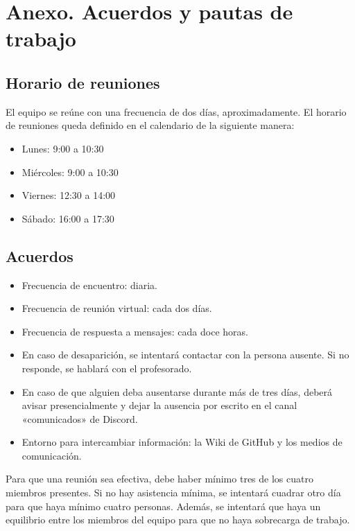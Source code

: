 \documentclass[../main.tex]{subfiles}
\begin{document}
\section{Anexo. Acuerdos y pautas de trabajo}
\subsection{Horario de reuniones}

El equipo se reúne con una frecuencia de dos días, aproximadamente. El horario de reuniones queda definido en el calendario de la siguiente manera: 

\begin{itemize}
    \item Lunes: 9:00 a 10:30
    \item Miércoles: 9:00 a 10:30
    \item Viernes: 12:30 a 14:00
    \item Sábado: 16:00 a 17:30
\end{itemize}

\subsection{Acuerdos}

\begin{itemize}
    \item Frecuencia de encuentro: diaria.
    \item Frecuencia de reunión virtual: cada dos días.
    \item Frecuencia de respuesta a mensajes: cada doce horas.
    \item En caso de desaparición, se intentará contactar con la persona ausente. Si no responde, se hablará con el profesorado.
    \item En caso de que alguien deba ausentarse durante más de tres días, deberá avisar presencialmente y dejar la ausencia por escrito en el canal «comunicados» de Discord.
    \item Entorno para intercambiar información: la Wiki de GitHub y los medios de comunicación.
\end{itemize}

Para que una reunión sea efectiva, debe haber mínimo tres de los cuatro miembros presentes. Si no hay asistencia mínima, se intentará cuadrar otro día para que haya mínimo cuatro personas. Además, se intentará que haya un equilibrio entre los miembros del equipo para que no haya sobrecarga de trabajo.\par
\end{document}
